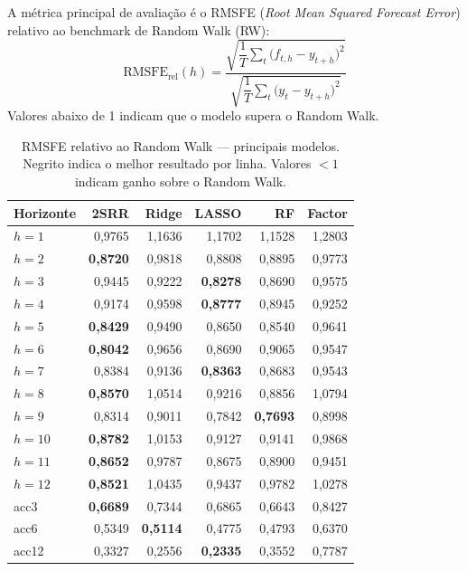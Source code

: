 \documentclass[12pt, a4paper]{article}
\begin{document}
A métrica principal de avaliação é o RMSFE
(\textit{Root Mean Squared Forecast Error}) relativo ao benchmark
de Random Walk (RW):
\[
  \text{RMSFE}_{\text{rel}}(h) =
  \frac%
    {\sqrt{\dfrac{1}{T}\displaystyle\sum_t
      \bigl(f_{t,h} - y_{t+h}\bigr)^2}}%
    {\sqrt{\dfrac{1}{T}\displaystyle\sum_t
      \bigl(y_t    - y_{t+h}\bigr)^2}}
\]
Valores abaixo de 1 indicam que o modelo supera o Random Walk.

\begin{table}[H]
\centering
\caption{RMSFE relativo ao Random Walk --- principais modelos.
  Negrito indica o melhor resultado por linha.
  Valores $< 1$ indicam ganho sobre o Random Walk.}
\label{tab:rmsfe}
\begin{tabular}{lrrrrr}
\toprule
Horizonte & \textbf{2SRR} & Ridge  & LASSO  & RF     & Factor \\
\midrule
$h=1$  & 0{,}9765 & 1{,}1636 & 1{,}1702 & 1{,}1528 & 1{,}2803 \\
$h=2$  & \textbf{0{,}8720} & 0{,}9818 & 0{,}8808 & 0{,}8895 & 0{,}9773 \\
$h=3$  & 0{,}9445 & 0{,}9222 & \textbf{0{,}8278} & 0{,}8690 & 0{,}9575 \\
$h=4$  & 0{,}9174 & 0{,}9598 & \textbf{0{,}8777} & 0{,}8945 & 0{,}9252 \\
$h=5$  & \textbf{0{,}8429} & 0{,}9490 & 0{,}8650 & 0{,}8540 & 0{,}9641 \\
$h=6$  & \textbf{0{,}8042} & 0{,}9656 & 0{,}8690 & 0{,}9065 & 0{,}9547 \\
$h=7$  & 0{,}8384 & 0{,}9136 & \textbf{0{,}8363} & 0{,}8683 & 0{,}9543 \\
$h=8$  & \textbf{0{,}8570} & 1{,}0514 & 0{,}9216 & 0{,}8856 & 1{,}0794 \\
$h=9$  & 0{,}8314 & 0{,}9011 & 0{,}7842 & \textbf{0{,}7693} & 0{,}8998 \\
$h=10$ & \textbf{0{,}8782} & 1{,}0153 & 0{,}9127 & 0{,}9141 & 0{,}9868 \\
$h=11$ & \textbf{0{,}8652} & 0{,}9787 & 0{,}8675 & 0{,}8900 & 0{,}9451 \\
$h=12$ & \textbf{0{,}8521} & 1{,}0435 & 0{,}9437 & 0{,}9782 & 1{,}0278 \\
\midrule
acc3   & \textbf{0{,}6689} & 0{,}7344 & 0{,}6865 & 0{,}6643 & 0{,}8427 \\
acc6   & 0{,}5349 & \textbf{0{,}5114} & 0{,}4775 & 0{,}4793 & 0{,}6370 \\
acc12  & 0{,}3327 & 0{,}2556 & \textbf{0{,}2335} & 0{,}3552 & 0{,}7787 \\
\bottomrule
\end{tabular}
\end{table}
\end{document}
